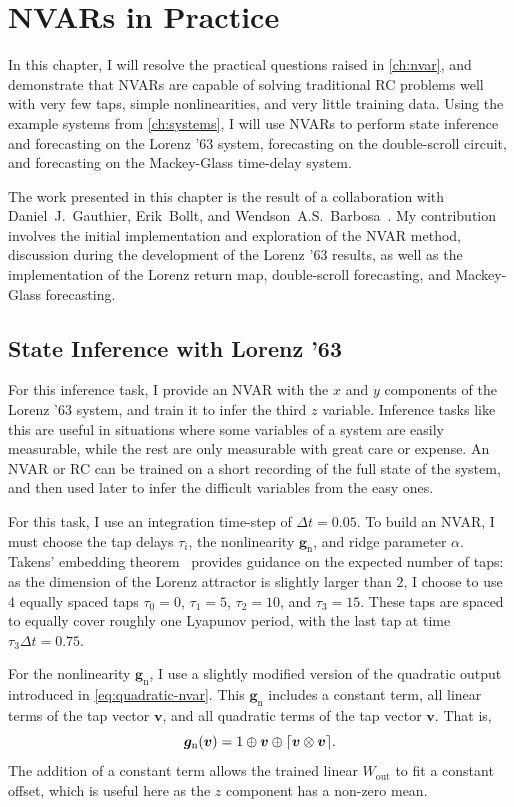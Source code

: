 \chapter{NVARs in Practice}\label{ch:nvar-application}

In this chapter, I will resolve the practical questions raised in
\cref{ch:nvar}, and demonstrate that NVARs are capable of solving
traditional RC problems well with very few taps, simple
nonlinearities, and very little training data. Using the example
systems from \cref{ch:systems}, I will use NVARs to perform state
inference and forecasting on the Lorenz '63 system, forecasting on the
double-scroll circuit, and forecasting on the Mackey-Glass time-delay
system.

The work presented in this chapter is the result of a
collaboration with Daniel~J.~Gauthier, Erik~Bollt, and Wendson~A.S.~Barbosa~\cite{gauthier2021}. My contribution involves the initial
implementation and exploration of the NVAR method, discussion during
the development of the Lorenz '63 results, as well as the
implementation of the Lorenz return map, double-scroll forecasting,
and Mackey-Glass forecasting.

\section{State Inference with Lorenz '63}

For this inference task, I provide an NVAR with the $x$ and $y$
components of the Lorenz '63 system, and train it to infer the third
$z$ variable. Inference tasks like this are useful in situations where
some variables of a system are easily measurable, while the rest are
only measurable with great care or expense. An NVAR or RC can be
trained on a short recording of the full state of the system, and then
used later to infer the difficult variables from the easy ones.

For this task, I use an integration time-step of $\Delta t = 0.05$. To
build an NVAR, I must choose the tap delays $\tau_i$, the
nonlinearity $\bm{g}_\text{n}$, and ridge parameter $\alpha$. Takens'
embedding theorem~\cite{takens1981} provides guidance on the expected
number of taps: as the dimension of the Lorenz attractor is slightly
larger than $2$, I choose to use $4$ equally spaced taps $\tau_0 =
0$, $\tau_1 = 5$, $\tau_2 = 10$, and $\tau_3 = 15$. These taps are
spaced to equally cover roughly one Lyapunov period, with the last tap
at time $\tau_3 \Delta t = 0.75$.

For the nonlinearity $\bm{g}_\text{n}$, I use a slightly modified
version of the quadratic output introduced in
\cref{eq:quadratic-nvar}. This $\bm{g}_\text{n}$ includes a constant
term, all linear terms of the tap vector $\bm{v}$, and all quadratic
terms of the tap vector $\bm{v}$. That is,
\begin{equation}
  \label{eq:quadratic-nvar-const}
  \bm{g}_\text{n}(\bm{v}) = 1 \oplus \bm{v} \oplus \lceil\bm{v} \otimes \bm{v}\rceil.
\end{equation}
The addition of a constant term allows the trained linear
$W_\text{out}$ to fit a constant offset, which is useful here as the
$z$ component has a non-zero mean.

